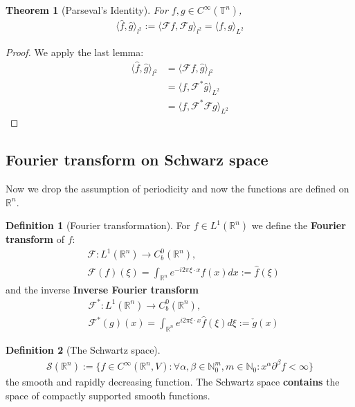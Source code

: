 \documentclass[a4paper,11pt,fleqn]{book}
\newtheorem{theorem}{Theorem}[section]
\theoremstyle{definition}
\newtheorem{definition}{Definition}[section]
\theoremstyle{remark}
\begin{document}
\begin{theorem}[Parseval's Identity]
	For $f, g \in C^\infty(\mathbb{T}^n)$, 
	\begin{align*}
		\langle \hat{f}, \hat{g} \rangle_{l^2} := \langle \mathcal{F} f, \mathcal{F} g \rangle_{l^2} = \langle  f, g \rangle_{L^2}
	\end{align*}
\end{theorem}
\begin{proof}
	We apply the last lemma:
	\begin{align*}
		\langle \hat{f}, \hat{g} \rangle_{l^2} &= \langle \mathcal{F} f, \hat{g} \rangle_{l^2}\\
		&= \langle f, \mathcal{F}^* \hat{g} \rangle_{L^2}\\
		&= \langle f, \mathcal{F}^* \mathcal{F} g \rangle_{L^2}
	\end{align*}
\end{proof}


\subsection{Fourier transform on Schwarz space}
Now we drop the assumption of periodicity and now the functions are defined on $\mathbb{R}^n$. 
\begin{definition}[Fourier transformation]
	For $f \in L^1(\mathbb{R}^n)$ we define the \textbf{Fourier transform} of $f$:
	\begin{align*}
		&\mathcal{F}: L^1(\mathbb{R}^n) \rightarrow C^0_b(\mathbb{R}^n),\\
		&\mathcal{F}(f)(\xi) = \int_{\mathbb{R}^n} e^{-i 2 \pi \xi \cdot  x} f(x) dx:= \hat{f}(\xi)
	\end{align*}
	and the inverse \textbf{Inverse Fourier transform}
	\begin{align*}
		&\mathcal{F}^*: L^1(\mathbb{R}^n) \rightarrow C^0_b(\mathbb{R}^n), \\
		&\mathcal{F}^*(g)(x) = \int_{\mathbb{R}^n} e^{i 2 \pi\xi \cdot x} \hat{f}(\xi) d\xi := \check{g}(x)
	\end{align*}
\end{definition}

\begin{definition}[The Schwartz space]
\begin{align*}
	\mathcal{S}(\mathbb{R}^n):= \{ f \in C^\infty(\mathbb{R}^n, V): \forall \alpha , \beta \in \mathbb{N}^m_0, m \in \mathbb{N}_0: x^\alpha \partial^\beta f < \infty\}
\end{align*}
the smooth and rapidly decreasing function. The Schwartz space \textbf{contains} the space of compactly supported smooth functions. 
\end{definition}
\end{document}
